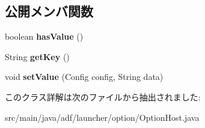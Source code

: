 \subsection*{公開メンバ関数}
\begin{DoxyCompactItemize}
\item 
\hypertarget{classadf_1_1launcher_1_1option_1_1OptionHost_abb42f49a819b9889ecaf165a78bbedc3}{}\label{classadf_1_1launcher_1_1option_1_1OptionHost_abb42f49a819b9889ecaf165a78bbedc3} 
boolean {\bfseries has\+Value} ()
\item 
\hypertarget{classadf_1_1launcher_1_1option_1_1OptionHost_a5b7e227657faf11c255472d983064fb3}{}\label{classadf_1_1launcher_1_1option_1_1OptionHost_a5b7e227657faf11c255472d983064fb3} 
String {\bfseries get\+Key} ()
\item 
\hypertarget{classadf_1_1launcher_1_1option_1_1OptionHost_ab98aa7285b91fcbc29e9db7959a46604}{}\label{classadf_1_1launcher_1_1option_1_1OptionHost_ab98aa7285b91fcbc29e9db7959a46604} 
void {\bfseries set\+Value} (Config config, String data)
\end{DoxyCompactItemize}


このクラス詳解は次のファイルから抽出されました\+:\begin{DoxyCompactItemize}
\item 
src/main/java/adf/launcher/option/Option\+Host.\+java\end{DoxyCompactItemize}
